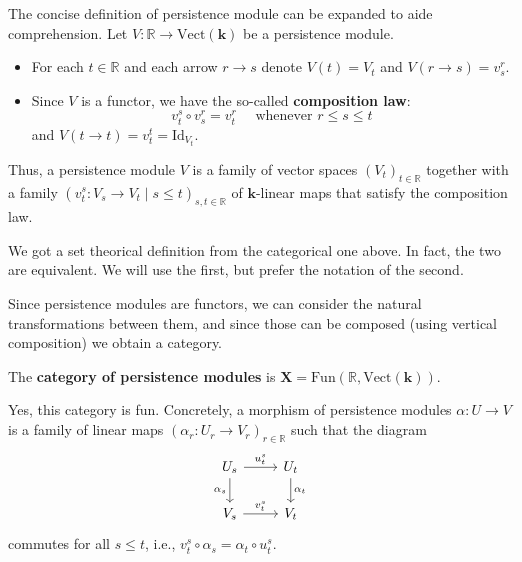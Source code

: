 \documentclass[11pt]{article}
\begin{document}
The   concise definition of persistence module can be expanded to aide 
comprehension.
Let \(V\colon \mathbb{R}\to \mathrm{Vect}(\mathbf{k} )\) be a persistence module.
\begin{itemize} 
\item For each \(t\in \mathbb{R} \) and each arrow \(r\to s\) denote \(V(t)=V_t\) and   \(V(r\to s) = v_s^r\).
\item Since \(V\) is a functor, we have the so-called \textbf{composition law}:
\[
 v_t^s\circ v_s^r = v_t^r\quad\text{ whenever } r\leq s\leq t
\]
and \(V(t\to t) = v_t^t = \mathrm{Id}_{V_t}\).
\end{itemize}
Thus, a persistence module \(V\) is a  family of vector spaces \((V_t)_{t\in \mathbb{R}}\)
together with a family
\((v_t^s \colon V_s\to V_t\mid s\leq t)_{s,t\in\mathbb{R}}\)
of \( \mathbf{k} \)-linear maps 
that satisfy the composition law. 

We got a  set theorical definition from the  categorical one above.
In fact, the  two are equivalent.
We will use the first, but   prefer the notation of the second.

Since persistence modules are functors, we can consider the natural transformations
between them, and since those can be composed (using vertical composition)
we obtain a category.

\begin{defi}
The \textbf{category of persistence modules} is 
\(\mathbf{X} = \mathrm{Fun}(\mathbb{R}, \mathrm{Vect}(\mathbf{k} ))\).
%
\end{defi}

Yes, this category is fun.
Concretely,
a morphism of persistence modules \(\alpha\colon U\to V\)
is a family of linear maps 
\((\alpha_r\colon U_r\to V_r)_{r\in \mathbb{R}}\)
such that 
the diagram 
\begin{equation}\label{eq:naturality-morphism-persistence-modules}
\begin{tikzcd}
U_s \arrow[r, "u_t^s"] \arrow[d, "\alpha_s"'] & U_t \arrow[d, "\alpha_t"] \\
V_s \arrow[r, "v_t^s"]                        & V_t                      
\end{tikzcd}
\end{equation}
commutes for all \(s\leq t\),
i.e., \(v_t^s \circ \alpha_s=\alpha_t\circ u_t^s\).
\end{document}
